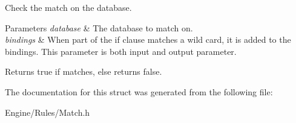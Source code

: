 Check the match on the database. 


\begin{DoxyParams}{Parameters}
{\em database} & The database to match on. \\
\hline
{\em bindings} & When part of the if clause matches a wild card, it is added to the bindings. This parameter is both input and output parameter. \\
\hline
\end{DoxyParams}
\begin{DoxyReturn}{Returns}
true if matches, else returns false. 
\end{DoxyReturn}


The documentation for this struct was generated from the following file\+:\begin{DoxyCompactItemize}
\item 
Engine/\+Rules/Match.\+h\end{DoxyCompactItemize}

